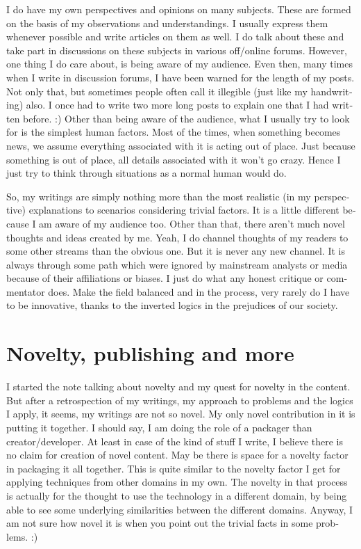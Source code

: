 \begin{english}
I do have my own perspectives and opinions on many subjects. These are formed on the basis of my observations and understandings. I usually express them whenever possible and write articles on them as well. I do talk about these and take part in discussions on these subjects in various off/online forums. However, one thing I do care about, is being aware of my audience. Even then, many times when I write in discussion forums, I have been warned for the length of my posts. Not only that, but sometimes people often call it illegible (just like my handwriting) also. I once had to write two more long posts to explain one that I had written before. :) Other than being aware of the audience, what I usually try to look for is the simplest human factors. Most of the times, when something becomes news, we assume everything associated with it is acting out of place. Just because something is out of place, all details associated with it won't go crazy. Hence I just try to think through situations as a normal human would do.

So, my writings are simply nothing more than the most realistic (in my perspective) explanations to scenarios considering trivial factors. It is a little different because I am aware of my audience too. Other than that, there aren't much novel thoughts and ideas created by me. Yeah, I do channel thoughts of my readers to some other streams than the obvious one. But it is never any new channel. It is always through some path which were ignored by mainstream analysts or media because of their affiliations or biases. I just do what any honest critique or commentator does. Make the field balanced and in the process, very rarely do I have to be innovative, thanks to the inverted logics in the prejudices of our society.

\section{Novelty, publishing and more}

I started the note talking about novelty and my quest for novelty in the content. But after a retrospection of my writings, my approach to problems and the logics I apply, it seems, my writings are not so novel. My only novel contribution in it is putting it together. I should say, I am doing the role of a packager than creator/developer. At least in case of the kind of stuff I write, I believe there is no claim for creation of novel content. May be there is space for a novelty factor in packaging it all together. This is quite similar to the novelty factor I get for applying techniques from other domains in my own. The novelty in that process is actually for the thought to use the technology in a different domain, by being able to see some underlying similarities between the different domains. Anyway, I am not sure how novel it is when you point out the trivial facts in some problems. :) 


\end{english}

